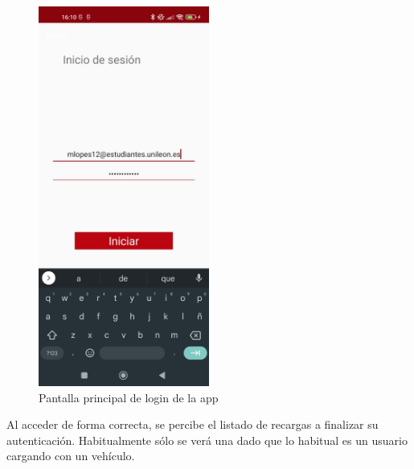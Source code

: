 \documentclass[12pt,a4paper,onecolumn,oneside]{report}
\begin{document}
\begin{figure}[H] 
\centering
  \includegraphics[width=0.5\textwidth]{figuras/design6.png}
  \caption[Pantalla principal de login de la app]{Pantalla principal de login de la app\\
  }
  \label{fig:design6}
\end{figure}

Al acceder de forma correcta, se percibe el listado de recargas a finalizar su autenticación. Habitualmente sólo se verá una dado que lo habitual es un usuario cargando con un vehículo.
\end{document}
